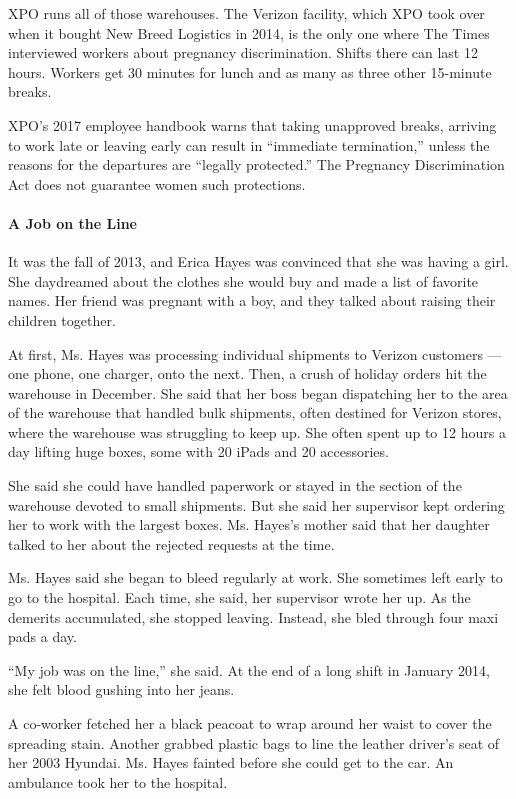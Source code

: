 XPO runs all of those warehouses. The Verizon facility, which XPO took
over when it bought New Breed Logistics in 2014, is the only one where
The Times interviewed workers about pregnancy discrimination. Shifts
there can last 12 hours. Workers get 30 minutes for lunch and as many as
three other 15-minute breaks.

XPO's 2017 employee handbook warns that taking unapproved breaks,
arriving to work late or leaving early can result in ``immediate
termination,'' unless the reasons for the departures are ``legally
protected.'' The Pregnancy Discrimination Act does not guarantee women
such protections.

\hypertarget{a-job-on-the-line}{%
\paragraph{A Job on the Line}\label{a-job-on-the-line}}

It was the fall of 2013, and Erica Hayes was convinced that she was
having a girl. She daydreamed about the clothes she would buy and made a
list of favorite names. Her friend was pregnant with a boy, and they
talked about raising their children together.

At first, Ms. Hayes was processing individual shipments to Verizon
customers --- one phone, one charger, onto the next. Then, a crush of
holiday orders hit the warehouse in December. She said that her boss
began dispatching her to the area of the warehouse that handled bulk
shipments, often destined for Verizon stores, where the warehouse was
struggling to keep up. She often spent up to 12 hours a day lifting huge
boxes, some with 20 iPads and 20 accessories.

She said she could have handled paperwork or stayed in the section of
the warehouse devoted to small shipments. But she said her supervisor
kept ordering her to work with the largest boxes. Ms. Hayes's mother
said that her daughter talked to her about the rejected requests at the
time.

Ms. Hayes said she began to bleed regularly at work. She sometimes left
early to go to the hospital. Each time, she said, her supervisor wrote
her up. As the demerits accumulated, she stopped leaving. Instead, she
bled through four maxi pads a day.

``My job was on the line,'' she said. At the end of a long shift in
January 2014, she felt blood gushing into her jeans.

A co-worker fetched her a black peacoat to wrap around her waist to
cover the spreading stain. Another grabbed plastic bags to line the
leather driver's seat of her 2003 Hyundai. Ms. Hayes fainted before she
could get to the car. An ambulance took her to the hospital.

